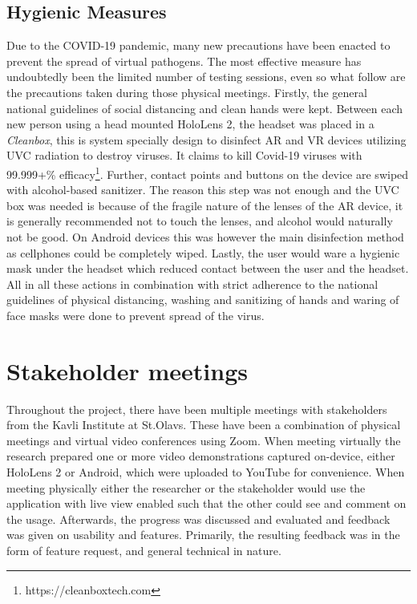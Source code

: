 \subsection{Hygienic Measures}
Due to the COVID-19 pandemic, many new precautions have been enacted to prevent the spread of virtual pathogens. The most effective measure has undoubtedly been the limited number of testing sessions, even so what follow are the precautions taken during those physical meetings. 
Firstly, the general national guidelines of social distancing and clean hands were kept. 
Between each new person using a head mounted HoloLens 2, the headset was placed in a \textit{Cleanbox}, this is system specially design to disinfect AR and VR devices utilizing UVC radiation to destroy viruses. It claims to kill Covid-19 viruses with 99.999+\% efficacy\footnote{https://cleanboxtech.com}. Further, contact points and buttons on the device are swiped with alcohol-based sanitizer. The reason this step was not enough and the UVC box was needed is because of the fragile nature of the lenses of the AR device, it is generally recommended not to touch the lenses, and alcohol would naturally not be good. On Android devices this was however the main disinfection method as cellphones could be completely wiped. Lastly, the user would ware a hygienic mask under the headset which reduced contact between the user and the headset.
All in all these actions in combination with strict adherence to the national guidelines of physical distancing, washing and sanitizing of hands and waring of face masks were done to prevent spread of the virus. 


\section{Stakeholder meetings}
Throughout the project, there have been multiple meetings with stakeholders from the Kavli Institute at St.Olavs. These have been a combination of physical meetings and virtual video conferences using Zoom. When meeting virtually the research prepared one or more video demonstrations captured on-device, either HoloLens 2 or Android, which were uploaded to YouTube for convenience. When meeting physically either the researcher or the stakeholder would use the application with live view enabled such that the other could see and comment on the usage. Afterwards, the progress was discussed and evaluated and feedback was given on usability and features. Primarily, the resulting feedback was in the form of feature request, and general technical in nature.

